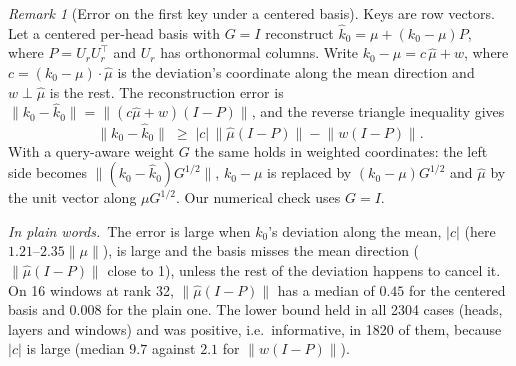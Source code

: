 \documentclass[10pt]{article}
\theoremstyle{plain}
\theoremstyle{definition}
\theoremstyle{remark}
\newtheorem{remark}[theorem]{Remark}
\newcommand{\T}{^{\top}}
\newcommand{\plain}{\noindent\emph{In plain words.}\ }
\begin{document}
\begin{remark}[Error on the first key under a centered basis]\label{rem:sink}
Keys are row vectors. Let a centered per-head basis with $G=I$ reconstruct $\hat k_0=\mu+(k_0-\mu)P$, where $P=U_rU_r\T$ and $U_r$ has orthonormal columns. Write $k_0-\mu=c\,\hat\mu+w$, where $c=(k_0-\mu)\cdot\hat\mu$ is the deviation's coordinate along the mean direction and $w\perp\hat\mu$ is the rest. The reconstruction error is $\lVert k_0-\hat k_0\rVert=\lVert(c\hat\mu+w)(I-P)\rVert$, and the reverse triangle inequality gives
\[
\lVert k_0-\hat k_0\rVert\;\ge\;\lvert c\rvert\,\lVert\hat\mu(I-P)\rVert-\lVert w(I-P)\rVert .
\]
With a query-aware weight $G$ the same holds in weighted coordinates: the left side becomes $\lVert(k_0-\hat k_0)G^{1/2}\rVert$, $k_0-\mu$ is replaced by $(k_0-\mu)G^{1/2}$ and $\hat\mu$ by the unit vector along $\mu G^{1/2}$. Our numerical check uses $G=I$.
\end{remark}
\plain The error is large when $k_0$'s deviation along the mean, $\lvert c\rvert$ (here $1.21$--$2.35\lVert\mu\rVert$), is large and the basis misses the mean direction ($\lVert\hat\mu(I-P)\rVert$ close to 1), unless the rest of the deviation happens to cancel it. On 16 windows at rank 32, $\lVert\hat\mu(I-P)\rVert$ has a median of $0.45$ for the centered basis and $0.008$ for the plain one. The lower bound held in all 2304 cases (heads, layers and windows) and was positive, i.e.\ informative, in 1820 of them, because $\lvert c\rvert$ is large (median $9.7$ against $2.1$ for $\lVert w(I-P)\rVert$).
\end{document}

